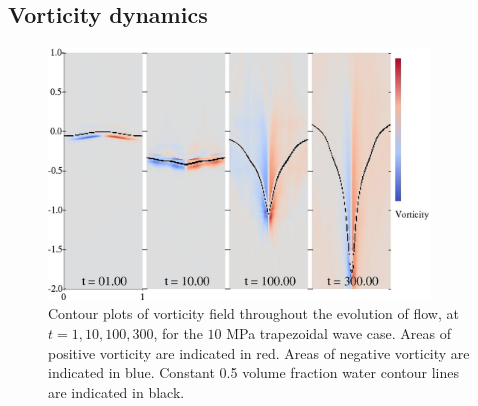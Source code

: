 \subsection{Vorticity dynamics}
\begin{figure}[h] 
  \centering
  \includegraphics[width=0.9\textwidth]{./figs/lung_figs/snapshots_vorticity_t1}
  \caption[The evolution of the vorticity] {Contour plots of vorticity
    field throughout the evolution of flow, at
    $t=1, 10, 100, 300$, for the $10$ MPa trapezoidal wave case. Areas
    of positive vorticity are indicated in red. Areas of negative
    vorticity are indicated in blue. Constant 0.5 volume fraction
    water contour lines are indicated in black.}
  \label{fig:vorticity_snapshots}
\end{figure}

